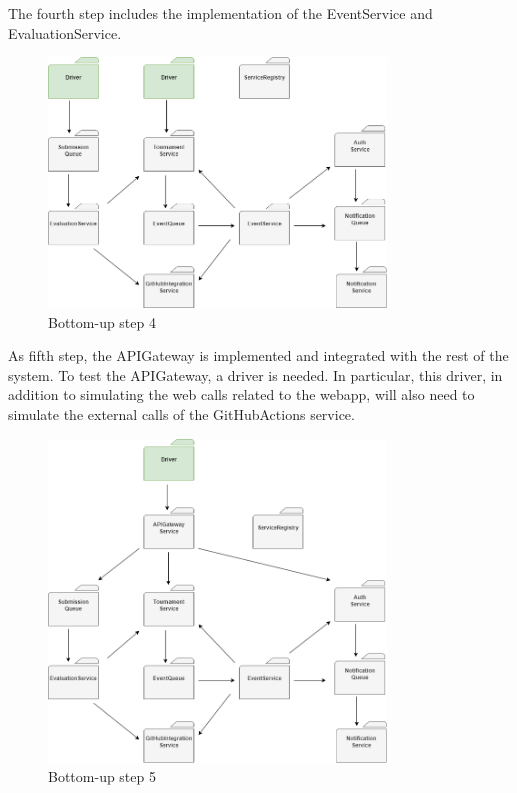 The fourth step includes the implementation of the EventService and EvaluationService.
\begin{figure}[H]
    \centering
    \includegraphics[width=0.8\textwidth]{Diagrams/integration_4.png}
    \caption{Bottom-up step 4}
\end{figure}

As fifth step, the APIGateway is implemented and integrated with the rest of the system. To test the APIGateway, a driver is needed. In particular, this driver, in addition to simulating the web calls related to the webapp, will also need to simulate the external calls of the GitHubActions service.
\begin{figure}[H]
    \centering
    \includegraphics[width=0.8\textwidth]{Diagrams/integration_5.png}
    \caption{Bottom-up step 5}
\end{figure}

